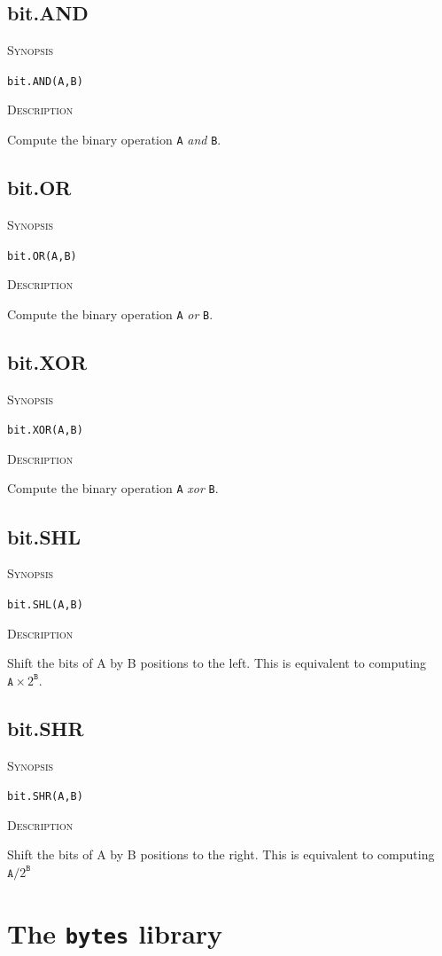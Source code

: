 \documentclass[11pt]{report}
\newcommand{\mansection}[1]{\vspace{0.5em}\par\noindent\textsc{#1}\vspace{0.5em}\par}
\newcommand{\syn}[1]{\texttt{#1}}
\begin{document}
\subsection{bit.AND}

\mansection{Synopsis}
\syn{bit.AND(A,B)}

\mansection{Description}
Compute the binary operation \syn{A} \textit{and} \syn{B}.

\subsection{bit.OR}

\mansection{Synopsis}
\syn{bit.OR(A,B)}

\mansection{Description}
Compute the binary operation \syn{A} \textit{or} \syn{B}.

\subsection{bit.XOR}

\mansection{Synopsis}
\syn{bit.XOR(A,B)}

\mansection{Description}
  Compute the binary operation \syn{A} \textit{xor} \syn{B}.

\subsection{bit.SHL}

\mansection{Synopsis}
\syn{bit.SHL(A,B)}

\mansection{Description}
  Shift the bits of A by B positions to the left. 
  This is equivalent to computing $\syn{A}{\times}2^{\syn{B}}$.

\subsection{bit.SHR}

\mansection{Synopsis}
\syn{bit.SHR(A,B)}

\mansection{Description}
  Shift the bits of A by B positions to the right. 
  This is equivalent to computing $\syn{A}/2^{\syn{B}}$

\section{The \syn{bytes} library}
\end{document}
